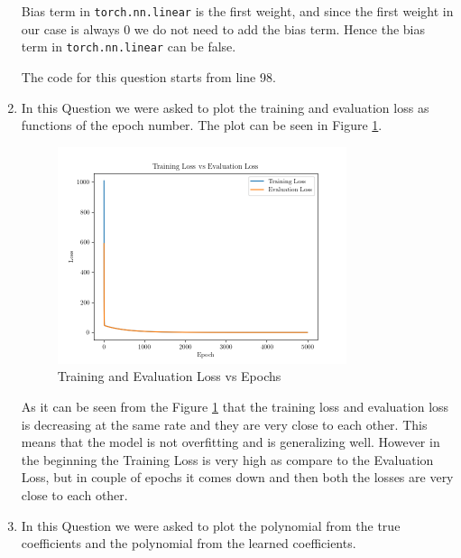 \documentclass[a4paper]{article}
\begin{document}
\begin{enumerate}
	      Bias term in \texttt{torch.nn.linear} is the first weight, and since the first weight in our case is always 0 we do not need to add the bias term. Hence the bias term in \texttt{torch.nn.linear} can be false.

	      The code for this question starts from line 98.

	\item In this Question we were asked to plot the training and evaluation loss as functions of the epoch number. The plot can be seen in Figure \ref{fig:question6}.

	      \begin{figure}[H]
		      \centering
		      \includegraphics[width=0.8\textwidth]{../Graph/Training-Evaluation-Loss.png}
		      \caption{Training and Evaluation Loss vs Epochs}
		      \label{fig:question6}
	      \end{figure}
	      As it can be seen from the Figure \ref{fig:question6} that the training loss and evaluation loss is decreasing at the same rate and they are very close to each other. This means that the model is not overfitting and is generalizing well. However in the beginning the Training Loss is very high as compare to the Evaluation Loss, but in couple of epochs it comes down and then both the losses are very close to each other.
	\item In this Question we were asked to plot the polynomial from the true coefficients and the polynomial from the learned coefficients.


\end{enumerate}
\end{document}
